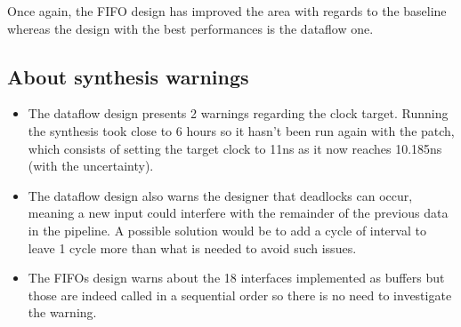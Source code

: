\documentclass[11pt,a4paper]{article}
\begin{document}
Once again, the FIFO design has improved the area with regards to the baseline whereas the design with the best performances is the dataflow one.

\subsection{About synthesis warnings}
\begin{itemize}
    \item The dataflow design presents 2 warnings regarding the clock target. Running the synthesis took close to 6 hours so it hasn't been run again with the patch, which consists of setting the target clock to 11ns as it now reaches 10.185ns (with the uncertainty).
    \item The dataflow design also warns the designer that deadlocks can occur, meaning a new input could interfere with the remainder of the previous data in the pipeline. A possible solution would be to add a cycle of interval to leave 1 cycle more than what is needed to avoid such issues.
    \item The FIFOs design warns about the 18 interfaces implemented as buffers but those are indeed called in a sequential order so there is no need to investigate the warning.
\end{itemize}
\end{document}
